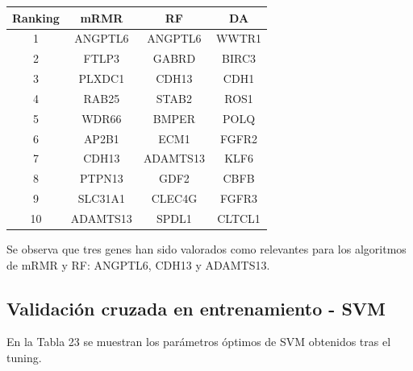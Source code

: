 \begin{table}[H]
	\centering
	\begin{tabular}{cccc}
		\hline
		\textbf{Ranking} & \multicolumn{1}{c}{\textbf{mRMR}} & \multicolumn{1}{c}{\textbf{RF}} & \multicolumn{1}{c}{\textbf{DA}} \\ \hline
		1                & ANGPTL6                           & ANGPTL6                         & WWTR1                           \\
		2                & FTLP3                             & GABRD                           & BIRC3                           \\
		3                & PLXDC1                            & CDH13                           & CDH1                            \\
		4                & RAB25                             & STAB2                           & ROS1                            \\
		5                & WDR66                             & BMPER                           & POLQ                            \\
		6                & AP2B1                             & ECM1                            & FGFR2                           \\
		7                & CDH13                             & ADAMTS13                        & KLF6                            \\
		8                & PTPN13                            & GDF2                            & CBFB                            \\
		9                & SLC31A1                           & CLEC4G                          & FGFR3                           \\
		10               & ADAMTS13                          & SPDL1                           & CLTCL1                          \\ \hline
	\end{tabular}
\end{table}

Se observa que tres genes han sido valorados como relevantes para los algoritmos de mRMR y RF:  ANGPTL6, CDH13 y ADAMTS13.

\subsection{Validación cruzada en entrenamiento - SVM}

En la Tabla 23 se muestran los parámetros óptimos de SVM obtenidos tras el tuning.\\

